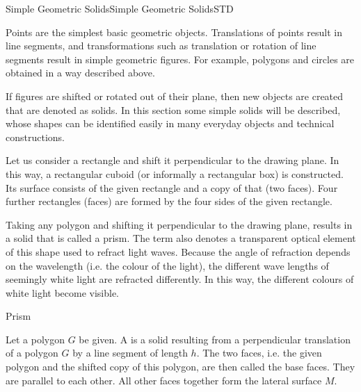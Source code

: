 \begin{MXContent}{Simple Geometric Solids}{Simple Geometric Solids}{STD}%

Points are the simplest basic geometric objects. Translations of points result in
line segments, and transformations such as translation or rotation of 
line segments result in simple geometric figures. For example, polygons and circles 
are obtained in a way described above. 

If figures are shifted or rotated out of their plane, then new objects are 
created that are denoted as solids. In this section some simple solids 
will be described, whose shapes can be identified easily in many everyday objects 
and technical constructions.

\begin{MExample}
Let us consider a rectangle and shift it perpendicular to the drawing plane.
In this way, a rectangular cuboid (or informally a rectangular box) is constructed. 
Its surface consists of the given rectangle and a copy of that (two faces). Four further rectangles (faces) are formed by the four sides of the given rectangle.
\end{MExample}

Taking any polygon and shifting it perpendicular to the drawing plane, results in a solid 
that is called a prism. The term also denotes a transparent optical element 
of this shape used to refract light waves. Because the angle of refraction
depends on the wavelength (i.e. the colour of the light), the different wave lengths of seemingly white 
light are refracted differently. In this way, the different colours of white light become visible.

\begin{MXInfo}{Prism}

Let a polygon $G$ be given. A  is a solid resulting from 
a perpendicular translation of a polygon $G$ by a line segment of length $h$.
The two faces, i.e. the given polygon and the shifted copy of this polygon,
are then called the base faces. They are parallel to each other. All other 
faces together form the lateral surface $M$.


\end{MXInfo}
\end{MXContent}
